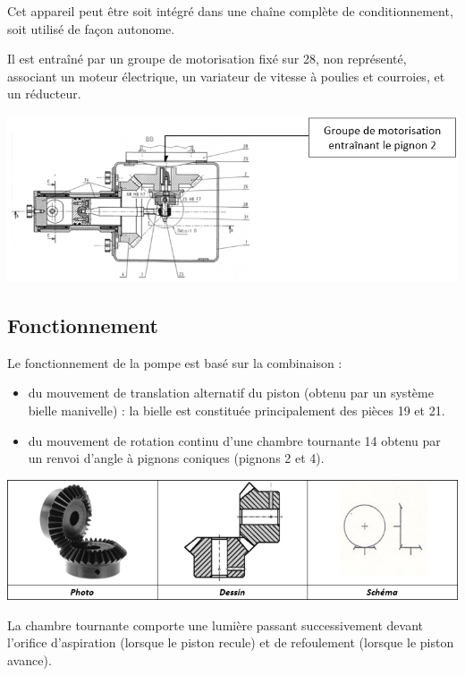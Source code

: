\begin{multicols}{2}
\begin{multicols}{2}
Cet appareil peut être soit intégré dans une chaîne complète de conditionnement, soit utilisé de façon autonome.

Il est entraîné par un groupe de motorisation fixé sur 28, non représenté,  associant un moteur électrique, un variateur de vitesse à poulies et courroies, et un réducteur.

\begin{center}
\includegraphics[width=\linewidth]{images/fig_05}
\end{center}


\subsection*{Fonctionnement}
Le fonctionnement de la pompe est basé sur la combinaison :
\begin{itemize}
\item du mouvement de translation alternatif du piston (obtenu par un système bielle manivelle) : la bielle est constituée principalement des pièces 19 et 21.
\item du mouvement de rotation continu d’une chambre tournante 14 obtenu par un renvoi d’angle à pignons coniques (pignons 2 et 4).
\end{itemize}

\begin{center}
\includegraphics[width=\linewidth]{images/fig_06}
\end{center}

La chambre tournante comporte une lumière passant successivement devant l’orifice d’aspiration (lorsque le piston recule) et de refoulement (lorsque le piston avance).


\end{multicols}
\end{multicols}
